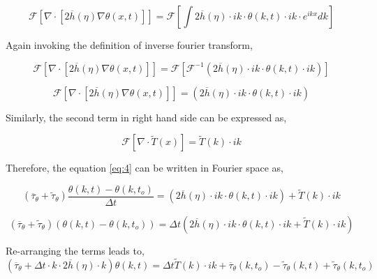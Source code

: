 \documentclass[a4paper,11pt,dvipsnames]{article}
\begin{document}
\begin{equation}
\mathcal{F} \left [ \nabla \cdot \left [ 2 \overline{h}(\eta) \nabla \theta (x,t) \right ] \right ] = 
\mathcal{F} \left [ \int 2 \overline{h} (\eta) \cdot ik \cdot \theta (k,t) \cdot ik \cdot e^{ikx} dk \right ] \label{eq:9}
\end{equation}

Again invoking the definition of inverse fourier transform,

\begin{equation}
\mathcal{F} \left [ \nabla \cdot \left [ 2 \overline{h}(\eta) \nabla \theta (x,t) \right ] \right ] = 
\mathcal{F} \left [ \mathcal{F}^{-1} \left ( 2 \overline{h} (\eta) \cdot ik \cdot \theta (k,t) \cdot ik \right ) \right ] \label{eq:10}
\end{equation}

\begin{equation}
\mathcal{F} \left [ \nabla \cdot \left [ 2 \overline{h}(\eta) \nabla \theta (x,t) \right ] \right ] = 
\left ( 2 \overline{h} (\eta) \cdot ik \cdot \theta (k,t) \cdot ik \right ) \label{eq:11}
\end{equation}

Similarly, the second term in right hand side can be expressed as, 

\begin{equation}
\mathcal{F} \left [ \nabla \cdot \tilde{T}(x) \right ] = 
\tilde{T}(k) \cdot ik \label{eq:12}
\end{equation}

Therefore, the equation \ref{eq:4} can be written in Fourier space as, 

\begin{equation}
\left ( \overline{\tau}_\theta + \tilde{\tau}_\theta \right ) \frac{\theta (k,t) - \theta (k,t_o)}{\Delta t} = \left ( 2 \overline{h} (\eta) \cdot ik \cdot \theta (k,t) \cdot ik \right ) +  \tilde{T}(k) \cdot ik \label{eq:13}
\end{equation}

\begin{equation}
\left ( \overline{\tau}_\theta + \tilde{\tau}_\theta \right )\left ( \theta (k,t) - \theta (k,t_o)\right ) = \Delta t \left ( 2 \overline{h} (\eta) \cdot ik \cdot \theta (k,t) \cdot ik +  \tilde{T}(k) \cdot ik \right ) \label{eq:14}
\end{equation}

Re-arranging the terms leads to, 
\begin{equation}
\left ( \overline{\tau}_\theta + \Delta t \cdot k \cdot 2 \overline{h} (\eta) \cdot k \right ) \theta (k,t) = 
\Delta t \tilde{T}(k) \cdot ik + \overline{\tau}_\theta (k,t_o) - \tilde{\tau}_\theta (k,t) + \tilde{\tau}_\theta (k,t_o) \label{eq:14}
\end{equation}
\end{document}
